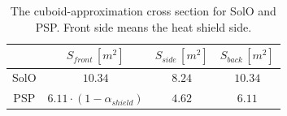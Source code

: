 \begin{table}[t]
\caption{The cuboid-approximation cross section for SolO and PSP. Front side means the heat shield side.}
\centering
\label{tab:cross_section}
\begin{tabular}{c|ccc}
\multicolumn{1}{p{1.2cm}}{  } \vline &  
\multicolumn{1}{p{3cm}}{ \centering $S_{front} \, [m^2]$ } & 
\multicolumn{1}{p{2cm}}{ \centering $S_{side} \, [m^2]$} & 
\multicolumn{1}{p{2cm}}{ \centering $S_{back} \, [m^2]$} \\
\hline
SolO & $10.34$ & $8.24$ & $10.34$   \\
PSP & $6.11 \cdot (1-\alpha_{shield})$ & $4.62$ & $6.11$  \\
\hline
\end{tabular}
\end{table}

